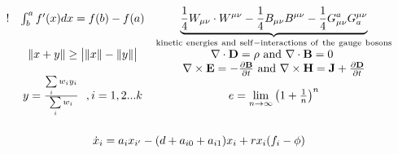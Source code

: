 \documentclass[12pt, a4paper, oneside]{ctexart}
\begin{document}
\begin{gather*}
    \begin{array}{ c c c }
        ! & \int _{b}^{a} f'( x) dx=f( b) -f( a)                                         & \underbrace{\frac{1}{4} W_{\mu \nu } \cdot W^{\mu \nu } -\frac{1}{4} B_{\mu \nu } B^{\mu \nu } -\frac{1}{4} G_{\mu \nu }^{a} G_{a}^{\mu \nu }}_{\mathrm{kinetic\ energies\ and\ self-interactions\ of\ the\ gauge\ bosons}} \\
          & \Vert x+y\Vert \geq \bigl|\Vert x\Vert -\Vert y\Vert \bigr|                  & \nabla \cdot \mathbf{D} =\rho \ \mathrm{and} \ \nabla \cdot \mathbf{B} =0\                                                                                                                                                  \\
          &                                                                              & \nabla \times \mathbf{E} =-\frac{\partial \mathbf{B}}{\partial t} \ \mathrm{and} \ \nabla \times \mathbf{H} =\mathbf{J} +\frac{\partial \mathbf{D}}{\partial t}                                                             \\
          & y=\frac{\sum\limits _{i} w_{i} y_{i}}{\sum\limits _{i} w_{i}} \ \ ,i=1,2...k & e=\lim\limits _{n\rightarrow \infty }\left( 1+\frac{1}{n}\right)^{n}                                                                                                                                                        \\
          &                                                                              &
    \end{array}\\
    \dot{x}_{i} =a_{i} x_{i'} -( d+a_{i0} +a_{i1}) x_{i} +rx_{i}( f_{i} -\phi )
\end{gather*}
\end{document}
